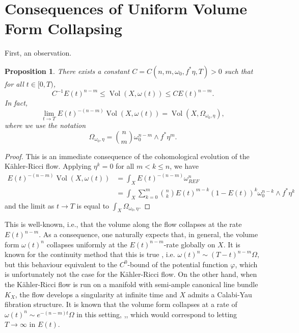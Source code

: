 \documentclass[12pt]{article}
\newtheorem{proposition}[theorem]{Proposition}
\numberwithin{equation}{section}
\DeclareMathOperator{\Vol}{Vol}
\begin{document}
\section{Consequences of Uniform Volume Form Collapsing}

\noindent First, an observation. 

\begin{proposition}
There exists a constant $C = C(n,m,\omega_0,f^*\eta, T)> 0$ such that for all $t \in [0,T)$,
\begin{equation*}
    C^{-1}E(t)^{n-m} \leq \Vol(X, \omega(t)) \leq CE(t)^{n-m}.
\end{equation*}
In fact,
\begin{equation*}
    \lim_{t \to T} E(t)^{-(n-m)} \Vol(X, \omega(t)) = \Vol(X, \Omega_{\omega_0,\eta}),
\end{equation*}
where we use the notation
\begin{equation*}
    \Omega_{\omega_0,\eta} = {n \choose m} \omega_0^{n-m} \wedge f^*\eta^m.
\end{equation*}
\end{proposition}

\begin{proof}
This is an immediate consequence of the cohomological evolution of the K\"ahler-Ricci flow. Applying $\eta^k = 0$ for all $m < k \leq n$, we have
\begin{align*}
    E(t)^{-(n-m)} \Vol(X, \omega(t))
    &= \int_X E(t)^{-(n-m)}\omega_{REF}^n\\ 
    &= \int_{X} \sum_{k=0}^m {n \choose k} E(t)^{m-k} (1-E(t))^{k} \omega_0^{n-k} \wedge f^* \eta^k
\end{align*}
and the limit as $t \to T$ is equal to $\int_X \Omega_{\omega_0, \eta}$.
\end{proof}

\noindent This is well-known, i.e., that the volume along the flow collapses at the rate $E(t)^{n-m}$. As a consequence, one naturally expects that, in general, the volume form $\omega(t)^n$ collapses uniformly at the $E(t)^{n-m}$-rate globally on $X$. It is known for the continuity method that this is true \cite[Lem. 3.2]{ZZ20}, i.e. $\omega(t)^n \sim (T-t)^{n-m} \Omega$, but this behaviour equivalent to the $C^0$-bound of the potential function $\varphi$, which is unfortunately not the case for the K\"ahler-Ricci flow. On the other hand, when the K\"ahler-Ricci flow is run on a manifold with semi-ample canonical line bundle $K_X$, the flow develops a singularity at infinite time and $X$ admits a Calabi-Yau fibration structure. It is known that the volume form collapses at a rate of $\omega(t)^n \sim e^{-(n-m)t}\Omega$ in this setting, \cite{ST16},\cite[Lem. 2.3]{FZ12}, which would correspond to letting $T \to\infty$ in $E(t)$.\\
\end{document}
